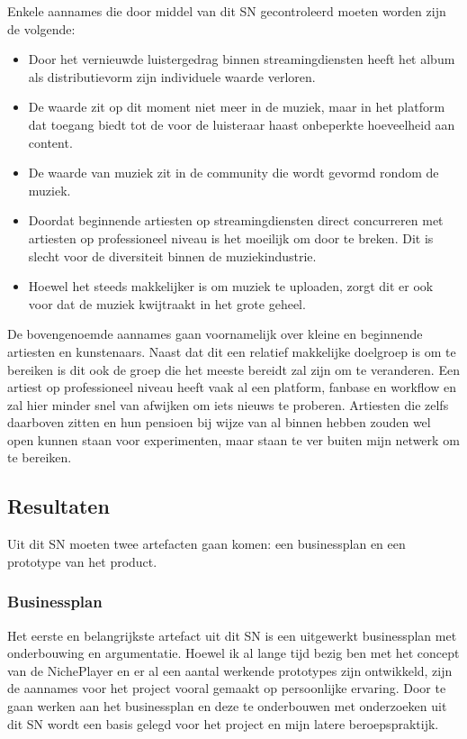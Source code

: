 Enkele aannames die door middel van dit SN gecontroleerd moeten worden zijn de volgende:

\begin{itemize}
    \item Door het vernieuwde luistergedrag binnen streamingdiensten heeft het album als distributievorm zijn individuele waarde verloren.
    \item De waarde zit op dit moment niet meer in de muziek, maar in het platform dat toegang biedt tot de voor de luisteraar haast onbeperkte hoeveelheid aan content.
    \item De waarde van muziek zit in de community die wordt gevormd rondom de muziek.
    \item Doordat beginnende artiesten op streamingdiensten direct concurreren met artiesten op professioneel niveau is het moeilijk om door te breken. Dit is slecht voor de diversiteit binnen de muziekindustrie.
    \item Hoewel het steeds makkelijker is om muziek te uploaden, zorgt dit er ook voor dat de muziek kwijtraakt in het grote geheel.
\end{itemize}

De bovengenoemde aannames gaan voornamelijk over kleine en beginnende artiesten en kunstenaars. Naast dat dit een relatief makkelijke doelgroep is om te bereiken is dit ook de groep die het meeste bereidt zal zijn om te veranderen. Een artiest op professioneel niveau heeft vaak al een platform, fanbase en workflow en zal hier minder snel van afwijken om iets nieuws te proberen. Artiesten die zelfs daarboven zitten en hun pensioen bij wijze van al binnen hebben zouden wel open kunnen staan voor experimenten, maar staan te ver buiten mijn netwerk om te bereiken.

\subsection{Resultaten}
Uit dit SN moeten twee artefacten gaan komen: een businessplan en een prototype van het product.

\subsubsection*{Businessplan}
Het eerste en belangrijkste artefact uit dit SN is een uitgewerkt businessplan met onderbouwing en argumentatie. Hoewel ik al lange tijd bezig ben met het concept van de NichePlayer en er al een aantal werkende prototypes zijn ontwikkeld, zijn de aannames voor het project vooral gemaakt op persoonlijke ervaring. Door te gaan werken aan het businessplan en deze te onderbouwen met onderzoeken uit dit SN wordt een basis gelegd voor het project en mijn latere beroepspraktijk.

